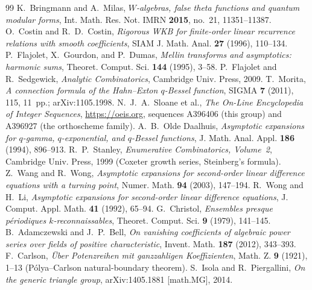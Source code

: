 \documentclass[11pt]{article}
\begin{document}
\begin{thebibliography}{99}
 K.~Bringmann and A.~Milas, \emph{$W$-algebras, false theta functions
and quantum modular forms}, Int. Math. Res. Not. IMRN \textbf{2015}, no.~21, 11351--11387.
 O.~Costin and R.~D.~Costin, \emph{Rigorous WKB for finite-order linear
recurrence relations with smooth coefficients}, SIAM J. Math. Anal. \textbf{27} (1996), 110--134.
 P.~Flajolet, X.~Gourdon, and P.~Dumas, \emph{Mellin transforms and asymptotics:
harmonic sums}, Theoret. Comput. Sci. \textbf{144} (1995), 3--58.
 P.~Flajolet and R.~Sedgewick, \emph{Analytic Combinatorics},
Cambridge Univ. Press, 2009.
 T.~Morita, \emph{A connection formula of the Hahn--Exton $q$-Bessel
function}, SIGMA \textbf{7} (2011), 115, 11~pp.; arXiv:1105.1998.
 N.~J.~A.~Sloane et al., \emph{The On-Line Encyclopedia of Integer Sequences},
\url{https://oeis.org}, sequences A396406 (this group) and A396927 (the orthoscheme family).
 A.~B.~Olde Daalhuis, \emph{Asymptotic expansions for $q$-gamma,
$q$-exponential, and $q$-Bessel functions}, J. Math. Anal. Appl. \textbf{186} (1994), 896--913.
 R.~P.~Stanley, \emph{Enumerative Combinatorics, Volume~2}, Cambridge Univ.
Press, 1999 (Coxeter growth series, Steinberg's formula).
 Z.~Wang and R.~Wong, \emph{Asymptotic expansions for second-order linear
difference equations with a turning point}, Numer. Math. \textbf{94} (2003), 147--194.
 R.~Wong and H.~Li, \emph{Asymptotic expansions for second-order linear
difference equations}, J. Comput. Appl. Math. \textbf{41} (1992), 65--94.
 G.~Christol, \emph{Ensembles presque p\'eriodiques $k$-reconnaissables},
Theoret. Comput. Sci. \textbf{9} (1979), 141--145.
 B.~Adamczewski and J.~P.~Bell, \emph{On vanishing coefficients of
algebraic power series over fields of positive characteristic}, Invent. Math. \textbf{187}
(2012), 343--393.
 F.~Carlson, \emph{\"Uber Potenzreihen mit ganzzahligen Koeffizienten},
Math. Z. \textbf{9} (1921), 1--13 (P\'olya--Carlson natural-boundary theorem).
 S.~Isola and R.~Piergallini, \emph{On the generic triangle group},
arXiv:1405.1881 [math.MG], 2014.
\end{thebibliography}
\end{document}
